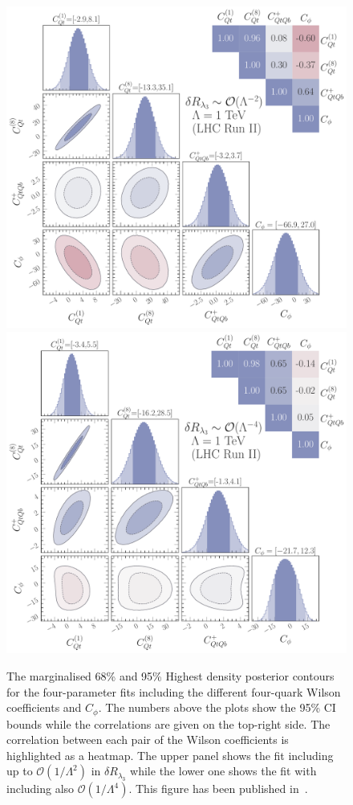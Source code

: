 	\begin{figure}[h!]
		\begin{center}
			\includegraphics[width=.6\linewidth]{fig/4param_fit_LHC_RunII_l3L_rge}\\
			\includegraphics[width=.6\linewidth]{fig/4param_fit_LHC_RunII_l3Q_rge}
		\end{center}
		\caption{The marginalised 68\% and 95\% Highest density posterior contours for the four-parameter fits including the different four-quark Wilson coefficients and $C_\phi$. The numbers above the plots show the 95\% CI bounds while the correlations are given on the top-right side. The correlation between each pair of the Wilson coefficients is highlighted as a heatmap.
			The upper panel shows the fit including up to $\mathcal{O}(1/\Lambda^2)$ in $\delta R_{\lambda_3}$  while the lower one shows the fit with including also  $\mathcal{O}(1/\Lambda^4)$.  This figure has been published in~\cite{Alasfar:2022zyr}. \label{fig:4param} }
	\end{figure}
